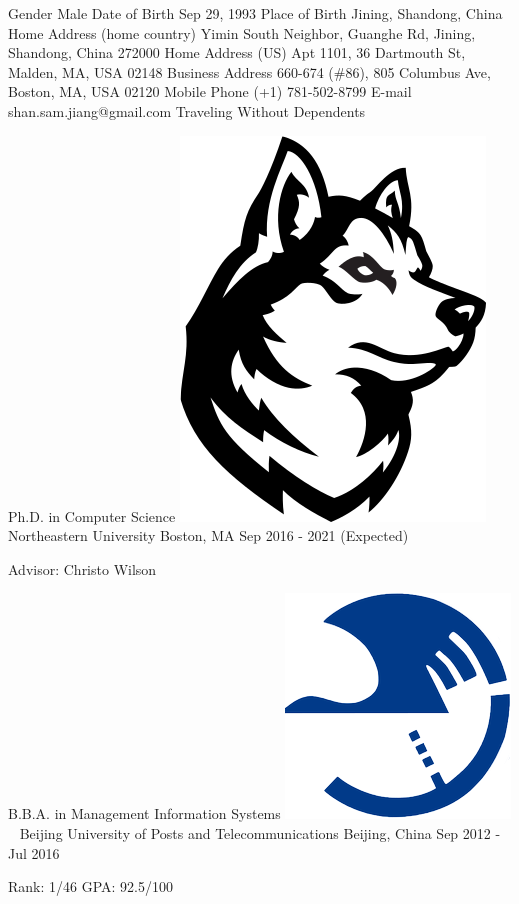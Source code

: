 \documentclass[letterpaper]{awesome-cv}
\begin{document}
\makecvheader

\addvspace{5ex}
\begin{cventries}
  \cvaward
    {Gender}
    {Male}
    { }
  \cvaward
    {Date of Birth}
    {Sep 29, 1993}
    { }
  \cvaward
    {Place of Birth}
    {Jining, Shandong, China}
    { }
  \cvaward
    {Home Address (home country)}
    {Yimin South Neighbor, Guanghe Rd, Jining, Shandong, China 272000}
    { }
  \cvaward
    {Home Address (US)}
    {Apt 1101, 36 Dartmouth St, Malden, MA, USA 02148}
    { }
  \cvaward
    {Business Address}
    {660-674 (\#86), 805 Columbus Ave, Boston, MA, USA 02120}
    { }
  \cvaward
    {Mobile Phone}
    {(+1) 781-502-8799}
    { }
  \cvaward
    {E-mail}
    {shan.sam.jiang@gmail.com}
    { }
  \cvaward
    {Traveling Without Dependents}
    { }
    { }
\end{cventries}

\addvspace{2ex}
\begin{cventries}
  \cventry
    {Ph.D. in Computer Science}
    {\includegraphics[height=0.02\textwidth]{../images/logos/northeastern.png}~ Northeastern University}
    {Boston, MA}
    {Sep 2016 - 2021 (Expected)}
    {
      \begin{cvitems}
        \item {Advisor: Christo Wilson}
      \end{cvitems}
    }
  \cventry
    {B.B.A. in Management Information Systems}
    {\includegraphics[height=0.017\textwidth]{../images/logos/bupt.png}~ Beijing University of Posts and Telecommunications}
    {Beijing, China}
    {Sep 2012 - Jul 2016}
    {
      \begin{cvitems}
        \item {Rank: 1/46 \hspace{0.5ex} GPA: 92.5/100}
      \end{cvitems}
    }
\end{cventries}
\end{document}
